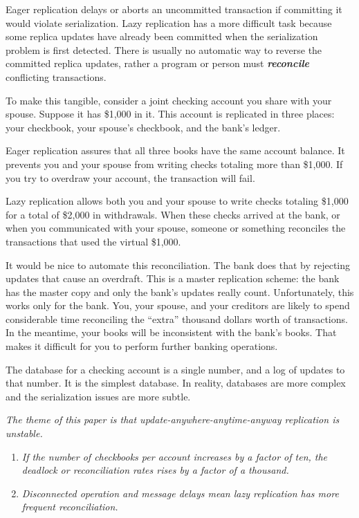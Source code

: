 \documentclass[a4paper,12pt,twoside,openright]{article}
\begin{document}
Eager replication delays or aborts an uncommitted transaction if
committing it would violate serialization. Lazy replication has a more
difficult task because some replica updates have already been committed
when the serialization problem is first detected. There is usually no
automatic way to reverse the committed replica updates, rather a program
or person must \emph{\textbf{reconcile}} conflicting transactions.

To make this tangible, consider a joint checking account you share with
your spouse. Suppose it has \$1,000 in it. This account is replicated in
three places: your checkbook, your spouse's checkbook, and the bank's
ledger.

Eager replication assures that all three books have the same account
balance. It prevents you and your spouse from writing checks totaling
more than \$1,000. If you try to overdraw your account, the transaction
will fail.

Lazy replication allows both you and your spouse to write checks
totaling \$1,000 for a total of \$2,000 in withdrawals. When these
checks arrived at the bank, or when you communicated with your spouse,
someone or something reconciles the transactions that used the virtual
\$1,000.

It would be nice to automate this reconciliation. The bank does that by
rejecting updates that cause an overdraft. This is a master replication
scheme: the bank has the master copy and only the bank's updates really
count. Unfortunately, this works only for the bank. You, your spouse,
and your creditors are likely to spend considerable time reconciling the
``extra'' thousand dollars worth of transactions. In the meantime, your
books will be inconsistent with the bank's books. That makes it
difficult for you to perform further banking operations.

The database for a checking account is a single number, and a log of
updates to that number. It is the simplest database. In reality,
databases are more complex and the serialization issues are more subtle.

\emph{The theme of this paper is that update-anywhere-anytime-anyway
replication is unstable. }

\begin{enumerate}
\def\labelenumi{\arabic{enumi}.}
\item
  \emph{If the number of checkbooks per account increases by a factor of
  ten, the deadlock or reconciliation rates rises by a factor of a
  thousand.}
\item
  \emph{Disconnected operation and message delays mean lazy replication
  has more frequent reconciliation.}
\end{enumerate}
\end{document}
